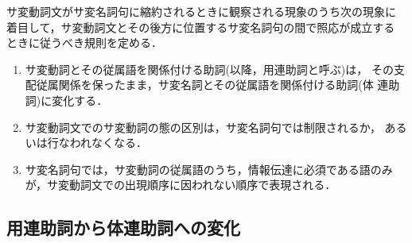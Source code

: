 サ変動詞文がサ変名詞句に縮約されるときに観察される現象のうち次の現象に
着目して，サ変動詞文とその後方に位置するサ変名詞句の間で照応が成立する
ときに従うべき規則を定める．
\begin{enumerate}
\item  サ変動詞とその従属語を関係付ける助詞(以降，用連助詞と呼ぶ)は，
その支配従属関係を保ったまま，サ変名詞とその従属語を関係付ける助詞(体
連助詞)に変化する．
\item サ変動詞文でのサ変動詞の態の区別は，サ変名詞句では制限されるか，
あるいは行なわれなくなる．
\item サ変名詞句では，サ変動詞の従属語のうち，情報伝達に必須である語のみ
が，サ変動詞文での出現順序に因われない順序で表現される．
\end{enumerate}

\subsection{用連助詞から体連助詞への変化}


